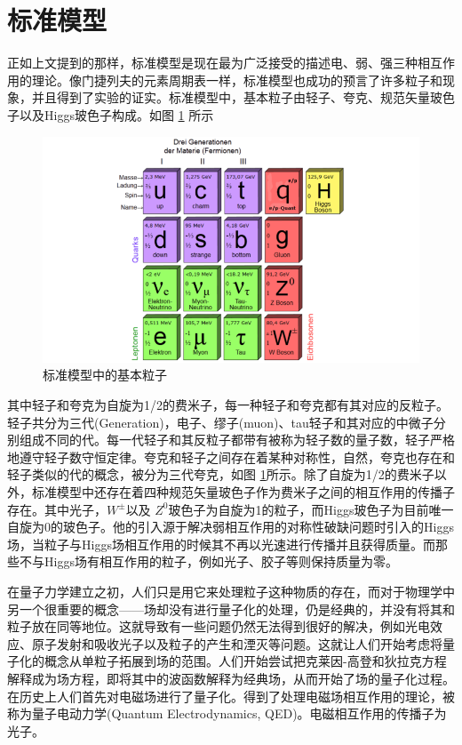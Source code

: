 \section{标准模型}

正如上文提到的那样，标准模型是现在最为广泛接受的描述电、弱、强三种相互作用的理论。像门捷列夫的元素周期表一样，标准模型也成功的预言了许多粒子和现象，并且得到了实验的证实。标准模型中，基本粒子由轻子、夸克、规范矢量玻色子以及Higgs玻色子构成。如图 \ref{fig:ParticleTable} 所示
\begin{figure}[htb]
    \begin{center}
    \includegraphics[width=\textwidth,clip]{figures/Chapter1/ParticleTable.png}
    \end{center}
    \caption[标准模型中的基本粒子]{标准模型中的基本粒子}
    \label{fig:ParticleTable}
\end{figure}
其中轻子和夸克为自旋为1/2的费米子，每一种轻子和夸克都有其对应的反粒子。轻子共分为三代(Generation)，电子、缪子(muon)、tau轻子和其对应的中微子分别组成不同的代。每一代轻子和其反粒子都带有被称为轻子数的量子数，轻子严格地遵守轻子数守恒定律。夸克和轻子之间存在着某种对称性，自然，夸克也存在和轻子类似的代的概念，被分为三代夸克，如图 \ref{fig:ParticleTable}所示。除了自旋为1/2的费米子以外，标准模型中还存在着四种规范矢量玻色子作为费米子之间的相互作用的传播子存在。其中光子，$W^{\pm}$以及 $Z^0$玻色子为自旋为1的粒子，而Higgs玻色子为目前唯一自旋为0的玻色子。他的引入源于解决弱相互作用的对称性破缺问题时引入的Higgs场，当粒子与Higgs场相互作用的时候其不再以光速进行传播并且获得质量。而那些不与Higgs场有相互作用的粒子，例如光子、胶子等则保持质量为零。

在量子力学建立之初，人们只是用它来处理粒子这种物质的存在，而对于物理学中另一个很重要的概念——场却没有进行量子化的处理，仍是经典的，并没有将其和粒子放在同等地位。这就导致有一些问题仍然无法得到很好的解决，例如光电效应、原子发射和吸收光子以及粒子的产生和湮灭等问题。这就让人们开始考虑将量子化的概念从单粒子拓展到场的范围。人们开始尝试把克莱因-高登和狄拉克方程解释成为场方程，即将其中的波函数解释为经典场，从而开始了场的量子化过程。在历史上人们首先对电磁场进行了量子化。得到了处理电磁场相互作用的理论，被称为量子电动力学(Quantum Electrodynamics, QED)。电磁相互作用的传播子为光子。

